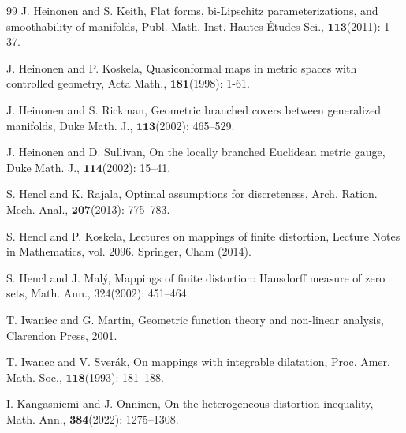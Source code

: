\documentclass[11pt,twoside]{article}
\theoremstyle{definition}
\theoremstyle{remark}
\begin{document}
\begin{thebibliography}{99}
J. Heinonen and S. Keith, Flat forms, bi-Lipschitz parameterizations, and smoothability of manifolds, Publ. Math. Inst. Hautes \'{E}tudes Sci., $\mathbf{113}$(2011): 1-37.

J. Heinonen and  P. Koskela,  Quasiconformal maps in metric spaces with controlled geometry, Acta Math., $\mathbf{181}$(1998): 1-61. 


J. Heinonen and S. Rickman, Geometric branched covers between generalized manifolds, Duke Math. J., $\mathbf{113}$(2002): 465–529.


J. Heinonen and D. Sullivan, On the locally branched Euclidean metric gauge, Duke Math. J., $\mathbf{114}$(2002): 15–41.






S. Hencl and K. Rajala, Optimal assumptions for discreteness, Arch. Ration. Mech. Anal., $\mathbf{207}$(2013): 775–783.
 



S. Hencl and P.  Koskela, Lectures on mappings of finite distortion, Lecture Notes in Mathematics, vol. 2096. Springer, Cham (2014).





















S. Hencl and J. Mal\'{y}, Mappings of finite distortion: Hausdorff measure of zero sets, Math. Ann., 324(2002): 451–464.










 T. Iwaniec and G. Martin, Geometric function theory and non-linear analysis, Clarendon Press, 2001.



T. Iwanec and V. \u{S}ver\'{a}k, On mappings with integrable dilatation, Proc. Amer. Math. Soc., $\mathbf{118}$(1993): 181–188.


I. Kangasniemi and J. Onninen, On the heterogeneous distortion inequality, Math. Ann., $\mathbf{384}$(2022): 1275–1308.


\end{thebibliography}
\end{document}
